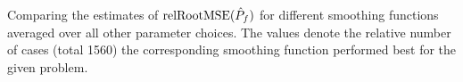 Comparing the estimates of $\textup{relRootMSE}(\hat{P}_f)$ for different smoothing functions averaged over  all other parameter choices. The values denote the relative number of cases (total 1560) the corresponding smoothing function performed best for the given problem.